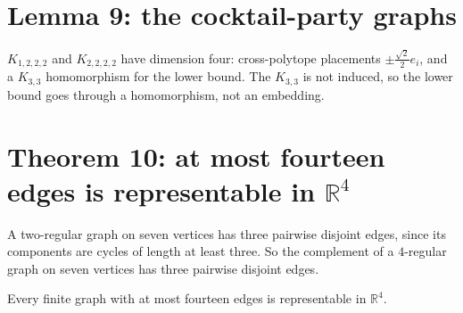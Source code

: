 \section{Lemma 9: the cocktail-party graphs}

\begin{lemma}
  \label{lem:cocktail}
  \leanok
  $K_{1,2,2,2}$ and $K_{2,2,2,2}$ have dimension four: cross-polytope placements
  $\pm \tfrac{\sqrt 2}{2} e_i$, and a $K_{3,3}$ homomorphism for the lower bound. The $K_{3,3}$ is
  not induced, so the lower bound goes through a homomorphism, not an embedding.
\end{lemma}

\section{Theorem 10: at most fourteen edges is representable in $\mathbb{R}^4$}

\begin{lemma}
  \label{lem:two-regular-seven}
  \leanok
  A two-regular graph on seven vertices has three pairwise disjoint edges, since its components
  are cycles of length at least three. So the complement of a $4$-regular graph on seven
  vertices has three pairwise disjoint edges.
\end{lemma}

\begin{theorem}
  \label{thm:fewer-than-fifteen}
  \leanok
  Every finite graph with at most fourteen edges is representable in $\mathbb{R}^4$.
\end{theorem}


